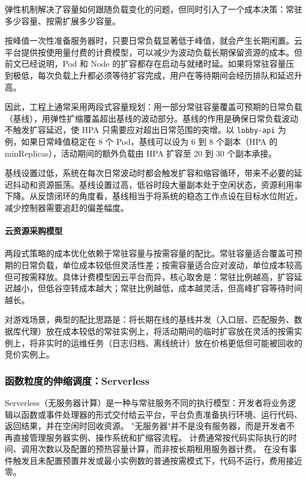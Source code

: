弹性机制解决了容量如何跟随负载变化的问题，但同时引入了一个成本决策：常驻多少容量、按需扩展多少容量。

按峰值一次性准备服务器时，只要日常负载显著低于峰值，就会产生长期闲置。云平台提供按使用量付费的计费模型，可以减少为波动负载长期保留资源的成本。但前文已经说明，Pod 和 Node 的扩容都存在启动与就绪时延。如果将常驻容量压到极低，每次负载上升都必须等待扩容完成，用户在等待期间会经历排队和延迟升高。

因此，工程上通常采用两段式容量规划：用一部分常驻容量覆盖可预期的日常负载（基线），用弹性扩缩覆盖超出基线的波动部分。基线的作用是确保日常负载波动不触发扩容延迟，使 HPA 只需要应对超出日常范围的突增。以 \texttt{lobby-api} 为例，如果日常峰值稳定在 8 个 Pod，基线可以设为 6 到 8 个副本（HPA 的 minReplicas），活动期间的额外负载由 HPA 扩容至 20 到 30 个副本承接。

基线设置过低，系统在每次日常波动时都会触发扩容和缩容循环，带来不必要的延迟抖动和资源振荡。基线设置过高，低谷时段大量副本处于空闲状态，资源利用率下降。从反馈闭环的角度看，基线相当于将系统的稳态工作点设在目标水位附近，减少控制器需要追赶的偏差幅度。

\paragraph{云资源采购模型}

两段式策略的成本优化依赖于常驻容量与按需容量的配比。常驻容量适合覆盖可预期的日常负载，单位成本较低但灵活性差；按需容量适合应对波动，单位成本较高但可按需释放。具体计费模型因云平台而异，核心取舍是：常驻比例越高，扩容延迟越小，但低谷空转成本越大；常驻比例越低，成本越灵活，但高峰扩容等待时间越长。

对游戏场景，典型的配比思路是：将长期在线的基线并发（入口层、匹配服务、数据库代理）放在成本较低的常驻实例上，将活动期间的临时扩容放在灵活的按需实例上，将非实时的运维任务（日志归档、离线统计）放在价格更低但可能被回收的竞价实例上。

\subsubsection{函数粒度的伸缩调度：Serverless}\label{sec5:serverless}

Serverless（无服务器计算）是一种与常驻服务不同的执行模型：开发者将业务逻辑以函数或事件处理器的形式交付给云平台，平台负责准备执行环境、运行代码、返回结果，并在空闲时回收资源。
"无服务器"并不是没有服务器，而是开发者不再直接管理服务器实例、操作系统和扩缩容流程。
计费通常按代码实际执行的时间、调用次数以及配置的预热容量计算，而非按长期租用服务器计费。
在没有事件触发且未配置预置并发或最小实例数的普通按需模式下，代码不运行，费用接近零。

